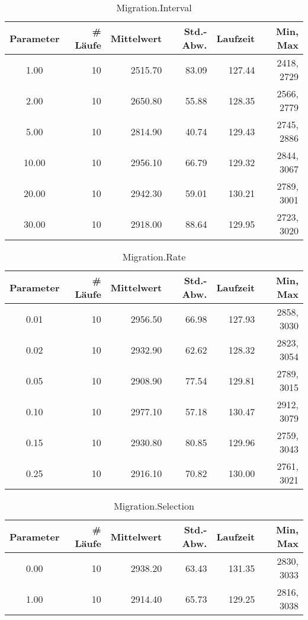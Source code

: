\begin{table}[tbp]
\begin{tabular}{ | c || r | r | r | r | r | }
\hline
Parameter & \# Läufe & Mittelwert & Std.-Abw. & Laufzeit & Min, Max \\
\hline
   1.00 &  10 & 2515.70 &   83.09 &  127.44 & 2418, 2729 \\
   2.00 &  10 & 2650.80 &   55.88 &  128.35 & 2566, 2779 \\
   5.00 &  10 & 2814.90 &   40.74 &  129.43 & 2745, 2886 \\
  10.00 &  10 & 2956.10 &   66.79 &  129.32 & 2844, 3067 \\
  20.00 &  10 & 2942.30 &   59.01 &  130.21 & 2789, 3001 \\
  30.00 &  10 & 2918.00 &   88.64 &  129.95 & 2723, 3020 \\
\hline
\end{tabular}
\caption{Migration.Interval}
\end{table}


\begin{table}[tbp]
\begin{tabular}{ | c || r | r | r | r | r | }
\hline
Parameter & \# Läufe & Mittelwert & Std.-Abw. & Laufzeit & Min, Max \\
\hline
   0.01 &  10 & 2956.50 &   66.98 &  127.93 & 2858, 3030 \\
   0.02 &  10 & 2932.90 &   62.62 &  128.32 & 2823, 3054 \\
   0.05 &  10 & 2908.90 &   77.54 &  129.81 & 2789, 3015 \\
   0.10 &  10 & 2977.10 &   57.18 &  130.47 & 2912, 3079 \\
   0.15 &  10 & 2930.80 &   80.85 &  129.96 & 2759, 3043 \\
   0.25 &  10 & 2916.10 &   70.82 &  130.00 & 2761, 3021 \\
\hline
\end{tabular}
\caption{Migration.Rate}
\end{table}


\begin{table}[tbp]
\begin{tabular}{ | c || r | r | r | r | r | }
\hline
Parameter & \# Läufe & Mittelwert & Std.-Abw. & Laufzeit & Min, Max \\
\hline
   0.00 &  10 & 2938.20 &   63.43 &  131.35 & 2830, 3033 \\
   1.00 &  10 & 2914.40 &   65.73 &  129.25 & 2816, 3038 \\
\hline
\end{tabular}
\caption{Migration.Selection}
\end{table}


